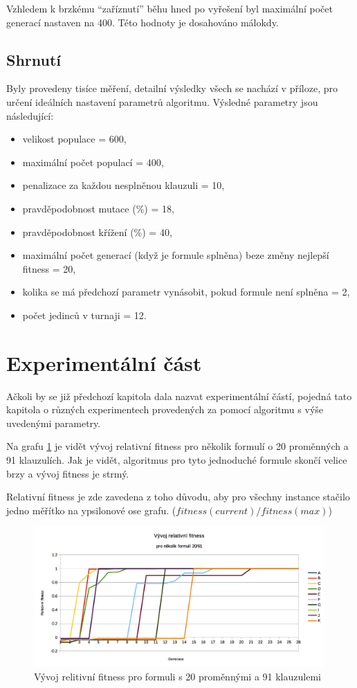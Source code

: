 \documentclass[a4paper]{article}
\begin{document}
	Vzhledem k brzkému \enquote{zaříznutí} běhu hned po vyřešení byl maximální počet generací nastaven na 400. Této hodnoty je dosahováno málokdy.
	
	\subsection{Shrnutí}
		Byly provedeny tisíce měření, detailní výsledky všech se nachází v příloze, pro určení ideálních nastavení parametrů algoritmu. Výsledné parametry jsou následující:
		\begin{itemize}
			\item velikost populace = 600,
			\item maximální počet populací = 400,
			\item penalizace za každou nesplněnou klauzuli = 10,
			\item pravděpodobnost mutace (\%) = 18,
			\item pravděpodobnost křížení (\%) = 40,
			\item maximální počet generací (když je formule splněna) beze změny nejlepší fitness = 20,
			\item kolika se má předchozí parametr vynásobit, pokud formule není splněna = 2,
			\item počet jedinců v turnaji = 12.
		\end{itemize}
	

\section{Experimentální část}
	Ačkoli by se již předchozí kapitola dala nazvat experimentální částí, pojedná tato kapitola o různých experimentech provedených za pomocí algoritmu s výše uvedenými parametry.
	
	Na grafu \ref{graf-vyvoj-20} je vidět vývoj relativní fitness pro několik formulí o 20 proměnných a 91 klauzulích. Jak je vidět, algoritmus pro tyto jednoduché formule skončí velice brzy a vývoj fitness je strmý.
	
	Relativní fitness je zde zavedena z toho důvodu, aby pro všechny instance stačilo jedno měřítko na ypsilonové ose grafu. ($fitness(current) / fitness(max)$)
	\begin{figure}[h]\centering
		\includegraphics[width=0.99\textwidth]{graf-vyvoj-20-91.png} 
		\caption{Vývoj relitivní fitness pro formuli s 20 proměnnými a 91 klauzulemi}
		\label{graf-vyvoj-20}
	\end{figure}
	
\end{document}
